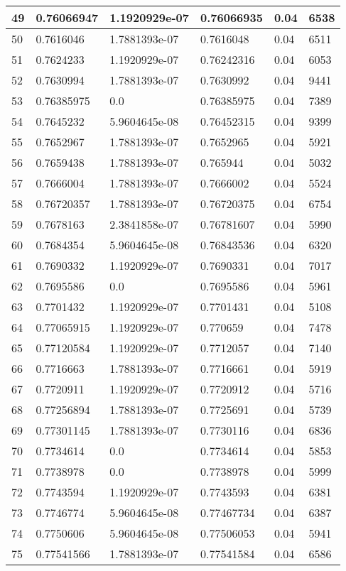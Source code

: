 \begin{longtable}{|l|l|l|l|l|l|}
49 & 0.76066947 & 1.1920929e-07 & 0.76066935 & 0.04 & 6538 \\ \hline 
50 & 0.7616046 & 1.7881393e-07 & 0.7616048 & 0.04 & 6511 \\ \hline 
51 & 0.7624233 & 1.1920929e-07 & 0.76242316 & 0.04 & 6053 \\ \hline 
52 & 0.7630994 & 1.7881393e-07 & 0.7630992 & 0.04 & 9441 \\ \hline 
53 & 0.76385975 & 0.0 & 0.76385975 & 0.04 & 7389 \\ \hline 
54 & 0.7645232 & 5.9604645e-08 & 0.76452315 & 0.04 & 9399 \\ \hline 
55 & 0.7652967 & 1.7881393e-07 & 0.7652965 & 0.04 & 5921 \\ \hline 
56 & 0.7659438 & 1.7881393e-07 & 0.765944 & 0.04 & 5032 \\ \hline 
57 & 0.7666004 & 1.7881393e-07 & 0.7666002 & 0.04 & 5524 \\ \hline 
58 & 0.76720357 & 1.7881393e-07 & 0.76720375 & 0.04 & 6754 \\ \hline 
59 & 0.7678163 & 2.3841858e-07 & 0.76781607 & 0.04 & 5990 \\ \hline 
60 & 0.7684354 & 5.9604645e-08 & 0.76843536 & 0.04 & 6320 \\ \hline 
61 & 0.7690332 & 1.1920929e-07 & 0.7690331 & 0.04 & 7017 \\ \hline 
62 & 0.7695586 & 0.0 & 0.7695586 & 0.04 & 5961 \\ \hline 
63 & 0.7701432 & 1.1920929e-07 & 0.7701431 & 0.04 & 5108 \\ \hline 
64 & 0.77065915 & 1.1920929e-07 & 0.770659 & 0.04 & 7478 \\ \hline 
65 & 0.77120584 & 1.1920929e-07 & 0.7712057 & 0.04 & 7140 \\ \hline 
66 & 0.7716663 & 1.7881393e-07 & 0.7716661 & 0.04 & 5919 \\ \hline 
67 & 0.7720911 & 1.1920929e-07 & 0.7720912 & 0.04 & 5716 \\ \hline 
68 & 0.77256894 & 1.7881393e-07 & 0.7725691 & 0.04 & 5739 \\ \hline 
69 & 0.77301145 & 1.7881393e-07 & 0.7730116 & 0.04 & 6836 \\ \hline 
70 & 0.7734614 & 0.0 & 0.7734614 & 0.04 & 5853 \\ \hline 
71 & 0.7738978 & 0.0 & 0.7738978 & 0.04 & 5999 \\ \hline 
72 & 0.7743594 & 1.1920929e-07 & 0.7743593 & 0.04 & 6381 \\ \hline 
73 & 0.7746774 & 5.9604645e-08 & 0.77467734 & 0.04 & 6387 \\ \hline 
74 & 0.7750606 & 5.9604645e-08 & 0.77506053 & 0.04 & 5941 \\ \hline 
75 & 0.77541566 & 1.7881393e-07 & 0.77541584 & 0.04 & 6586 \\ \hline 
\end{longtable}